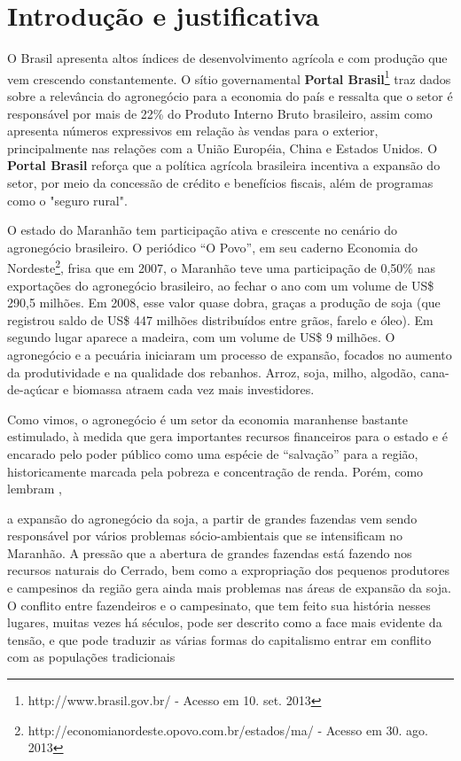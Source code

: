 \chapter{Introdução e justificativa}

O Brasil apresenta altos índices de desenvolvimento agrícola e com produção que vem crescendo constantemente. O sítio governamental \textbf{Portal Brasil}\footnote{http://www.brasil.gov.br/ - Acesso em 10. set. 2013} traz dados sobre a relevância do agronegócio para a economia do país e ressalta que o setor é responsável por mais de 22\% do Produto Interno Bruto brasileiro, assim como apresenta números expressivos em relação às vendas para o exterior, principalmente nas relações com a União Européia, China e Estados Unidos. O \textbf{Portal Brasil} reforça que a política agrícola brasileira incentiva a expansão do setor, por meio da concessão de crédito e benefícios fiscais, além de programas como o "seguro rural".

O estado do Maranhão tem participação ativa e crescente no cenário do agronegócio brasileiro. O periódico “O Povo”, em seu caderno Economia do Nordeste\footnote{http://economianordeste.opovo.com.br/estados/ma/ - Acesso em 30. ago. 2013}, frisa que em 2007, o Maranhão teve uma participação de 0,50\% nas exportações do agronegócio brasileiro, ao fechar o ano com um volume de US\$ 290,5 milhões. Em 2008, esse valor quase dobra, graças a produção de soja (que registrou saldo de US\$ 447 milhões distribuídos entre grãos, farelo e óleo). Em segundo lugar aparece a madeira, com um volume de US\$ 9 milhões. 
O agronegócio e a pecuária iniciaram um processo de expansão, focados no aumento da produtividade e na qualidade dos rebanhos. Arroz, soja, milho, algodão, cana-de-açúcar e biomassa atraem cada vez mais investidores.

Como vimos, o agronegócio é um setor da economia maranhense bastante estimulado, à medida que gera importantes recursos financeiros para o estado e é encarado pelo poder público como uma espécie de “salvação” para a região, historicamente marcada pela pobreza e concentração de renda. Porém, como lembram ,


\begin{citacao}
a expansão do agronegócio da soja, a partir de grandes fazendas vem sendo responsável por vários problemas sócio-ambientais que se intensificam no Maranhão. A pressão que a abertura de grandes fazendas está fazendo nos recursos naturais do Cerrado, bem como a expropriação dos pequenos produtores e campesinos da região gera ainda mais problemas nas áreas de expansão da soja. O conflito entre fazendeiros e o campesinato, que tem feito sua história nesses lugares, muitas vezes há séculos, pode ser descrito como a face mais evidente da tensão, e que pode traduzir as várias formas do capitalismo entrar em conflito com as populações tradicionais \cite[p. 1]{rodrigues_alencar}
\end{citacao}

